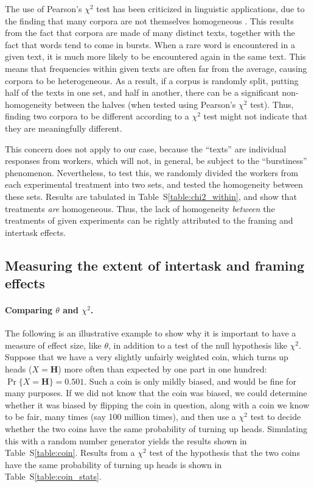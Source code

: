 \documentclass[12pt]{article}
\begin{document}
The use of Pearson's $\chi^2$ test has been criticized in linguistic 
applications, due to the finding that many corpora are not themselves
homogeneous \cite{kilgarriff1996comparing}.  
This results from the fact that corpora are made of many
distinct texts, together with the fact that words tend to come in bursts.
When a rare word is encountered in a given text, it is much more likely
to be encountered again in the same text. This means that
frequencies within given texts are often far from the average, causing 
corpora to be heterogeneous.
As a result, if a corpus is randomly split, putting half of the texts in one 
set, and half in another, there can be a significant non-homogeneity between 
the halves (when tested using Pearson's $\chi^2$ test).  Thus, finding two
corpora to be different according to a $\chi^2$ test might not 
indicate that they are meaningfully different.

This concern does not apply to our case, because the ``texts'' are 
individual responses from workers, which will not, in general, be subject to 
the ``burstiness'' phenomenon.  Nevertheless, to test this, we randomly 
divided the workers from each experimental treatment into two sets, and 
tested the homogeneity 
between these sets.  Results are tabulated in Table~S\ref{table:chi2_within}, 
and show that treatments 
\textit{are} homogeneous.  Thus, the lack of homogeneity \textit{between} 
the treatments of given experiments can be rightly attributed to the 
framing and intertask effects.

\subsection*{Measuring the extent of intertask and framing effects}

\paragraph{Comparing $\theta$ and $\chi^2$.}
The following is an illustrative example to show why it is important to 
have a measure of effect size, like $\theta$, in addition to a test of the 
null hypothesis like $\chi^2$.
Suppose that we have a very slightly unfairly weighted coin, which turns
up heads ($X=\mathbf{H}$) more often than expected by one part in one hundred:
$\Pr\{X=\mathbf{H}\} = 0.501$. Such a coin is only mildly biased, and would 
be fine for many purposes.  If we did not know that the coin was
biased, we could determine whether it was biased by flipping the coin in 
question, along with a coin we know to be fair, many times 
(say 100 million times), and then use a $\chi^2$ test to decide whether 
the two coins have the same probability of turning up heads.
Simulating this with a random number generator yields the results shown
in Table~S\ref{table:coin}.  Results from a $\chi^2$ test of the
hypothesis that the two coins have the same probability of turning up heads 
is shown in Table~S\ref{table:coin_stats}.
\end{document}
